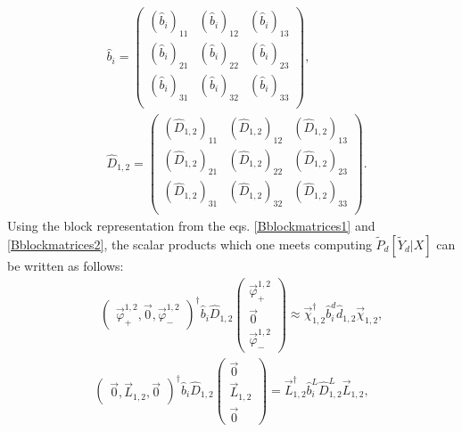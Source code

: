 \documentclass{article}
\begin{document}
\begin{align}
 &\hat{b}_{i} = 
 \begin{pmatrix}\label{Bblockmatrices1}
    (\hat{b}_{i})_{11} & (\hat{b}_{i})_{12} & (\hat{b}_{i})_{13} \\
    (\hat{b}_{i})_{21} & (\hat{b}_{i})_{22} & (\hat{b}_{i})_{23} \\
    (\hat{b}_{i})_{31} & (\hat{b}_{i})_{32} & (\hat{b}_{i})_{33} \\
 \end{pmatrix}, \\
 &\hat{D}_{1,2} = 
 \begin{pmatrix}\label{Bblockmatrices2}
    (\hat{D}_{1,2})_{11} & (\hat{D}_{1,2})_{12} & (\hat{D}_{1,2})_{13} \\
    (\hat{D}_{1,2})_{21} & (\hat{D}_{1,2})_{22} & (\hat{D}_{1,2})_{23} \\
    (\hat{D}_{1,2})_{31} & (\hat{D}_{1,2})_{32} & (\hat{D}_{1,2})_{33} \\
 \end{pmatrix}.
\end{align}
Using the block representation from the eqs. \eqref{Bblockmatrices1} and \eqref{Bblockmatrices2}, the scalar products which one meets computing $\tilde{P}_{d}[\tilde{Y}_{d}|X]$ can be written as follows:  
\begin{eqnarray}\label{Bsmallbddefinition}
    &&\begin{pmatrix}
        \vec{\varphi}_{+}^{1,2}, \vec{0}, \vec{\varphi}_{-}^{1,2}
    \end{pmatrix}^{\dag}
    \hat{b}_{i} \hat{D}_{1,2}
    \begin{pmatrix}
        \vec{\varphi}_{+}^{1,2}\\
        \vec{0}\\
        \vec{\varphi}_{-}^{1,2}
    \end{pmatrix}
    \approx \vec{\chi}_{1,2}^{\dagger}\hat{b}_{i}^{d}\hat{d}_{1,2}\vec{\chi}_{1,2}, 
\end{eqnarray}
\begin{eqnarray}
    \begin{pmatrix}
        \vec{0}, \vec{L}_{1,2}, \vec{0}
    \end{pmatrix}^{\dag}
    \hat{b}_{i} \hat{D}_{1,2}
    \begin{pmatrix}
        \vec{0}\\
        \vec{L}_{1,2}\\
        \vec{0}
    \end{pmatrix}
    = \vec{L}_{1,2}^{\dag} \hat{b}_{i}^{L} \hat{D}_{1,2}^{L} \vec{L}_{1,2},
\end{eqnarray}
\end{document}
